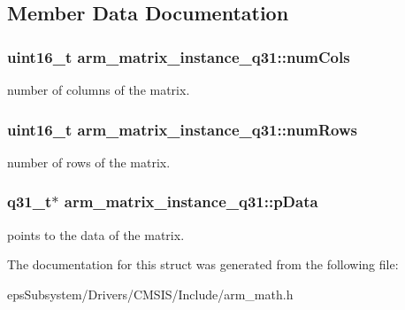 \subsection{Member Data Documentation}
\hypertarget{structarm__matrix__instance__q31_abd161da7614eda927157f18b698074b1}{
\subsubsection[{num\-Cols}]{\setlength{\rightskip}{0pt plus 5cm}uint16\-\_\-t arm\-\_\-matrix\-\_\-instance\-\_\-q31\-::num\-Cols}}\label{structarm__matrix__instance__q31_abd161da7614eda927157f18b698074b1}
number of columns of the matrix. \hypertarget{structarm__matrix__instance__q31_a63bacac158a821c8cfc06088d251598c}{
\subsubsection[{num\-Rows}]{\setlength{\rightskip}{0pt plus 5cm}uint16\-\_\-t arm\-\_\-matrix\-\_\-instance\-\_\-q31\-::num\-Rows}}\label{structarm__matrix__instance__q31_a63bacac158a821c8cfc06088d251598c}
number of rows of the matrix. \hypertarget{structarm__matrix__instance__q31_a09a64267c0579fef086efc9059741e56}{
\subsubsection[{p\-Data}]{\setlength{\rightskip}{0pt plus 5cm}q31\-\_\-t$\ast$ arm\-\_\-matrix\-\_\-instance\-\_\-q31\-::p\-Data}}\label{structarm__matrix__instance__q31_a09a64267c0579fef086efc9059741e56}
points to the data of the matrix. 

The documentation for this struct was generated from the following file\-:\begin{DoxyCompactItemize}
\item 
eps\-Subsystem/\-Drivers/\-C\-M\-S\-I\-S/\-Include/arm\-\_\-math.\-h\end{DoxyCompactItemize}
